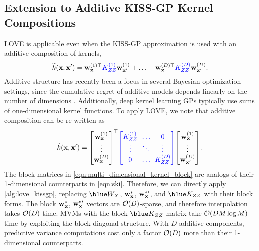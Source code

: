 \subsection{Extension to Additive KISS-GP Kernel Compositions}
LOVE{} is applicable even when the KISS-GP approximation is used with an additive composition of kernels,
%
\begin{equation}
  \widetilde{k}(\mathbf{x}, \mathbf{x}') =
  \mathbf{w}^{(1)\top}_{\mathbf{x}} {\color{blue} K^{(1)}_{Z Z}} \mathbf{w}^{(1)}_{\mathbf{x}'} + \ldots + \mathbf{w}^{(D)\top}_{\mathbf{x}} {\color{blue} K^{(D)}_{Z Z}} \mathbf{w}^{(D)}_{\mathbf{x}'}.
  \notag
\end{equation}
Additive structure has recently been a focus in several Bayesian optimization settings, since the cumulative regret of additive models depends linearly on the number of dimensions
\cite{kandasamy2015high,wang2017batched,gardner2017discovering,wang2017max}.
Additionally, deep kernel learning GPs \citep{wilson2016deep,wilson2016stochastic} typically use sums of one-dimensional kernel functions.
To apply LOVE{}, we note that additive composition can be re-written as
%
\begin{equation}
  \widetilde{k}(\bx, \bx') =
  \begin{bmatrix}
    \bw^{(1)}_{\bx} \\
    \vdots \\
    \bw^{(D)}_{\bx}
  \end{bmatrix}^\top
  \!
  {\color{blue}
  \begin{bmatrix}
    \bK^{(1)}_{\bZ \bZ} & \!\! \ldots \!\! & 0 \\
    \vdots & \!\! \ddots \!\! & \vdots \\
    0 & \!\! \ldots \!\! & \bK^{(D)}_{\bZ \bZ}
  \end{bmatrix}
  }
  \!
  \begin{bmatrix}
    \bw^{(1)}_{\bx} \\
    \vdots \\
    \bw^{(D)}_{\bx'}
  \end{bmatrix}.
  \label{eqn:multi_dimensional_kernel_block}
\end{equation}
%
The block matrices in \cref{eqn:multi_dimensional_kernel_block} are analogs of their 1-dimensional counterparts in \cref{eqn:ski}.
Therefore, we can directly apply \cref{alg:love_kissgp}, replacing $\blue \bW_\bX$, $\bw_\bxtest$, $\bw_\bxtestprime$, and $\blue \bK_{\bZ\bZ}$ with their block forms.
The block $\bw_\bxtest$, $\bw_\bxtestprime$ vectors are $\bigo{D}$-sparse, and therefore interpolation takes $\bigo{D}$ time.
MVMs with the block $\blue \bK_{\bZ\bZ}$ matrix take $\bigo{DM\log M}$ time by exploiting the block-diagonal structure.
With $D$ additive components, predictive variance computations cost only a factor $\bigo{D}$ more than their 1-dimensional counterparts.
